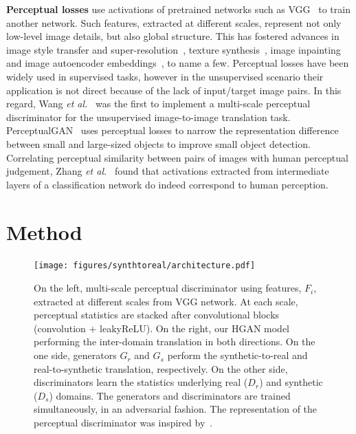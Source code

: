 \vspace*{0.1cm}\noindent\textbf{Perceptual losses} use activations of pretrained networks such as VGG~\cite{Simonyan2015} to train another network. Such features, extracted at different scales, represent not only low-level image details, but also global structure. This has fostered advances in image style transfer and super-resolution~\cite{Johnson2016,Wang2020}, texture synthesis~\cite{Ulyanov2016}, image inpainting~\cite{Su2019} and image autoencoder embeddings~\cite{Pihlgren2020}, to name a few. Perceptual losses have been widely used in supervised tasks, however in the unsupervised scenario their application is not direct because of the lack of input/target image pairs. In this regard, Wang \textit{et al.}~\cite{Wang2018} was the first to implement a multi-scale perceptual discriminator for the unsupervised image-to-image translation task. PerceptualGAN~\cite{Li2017} uses perceptual losses to narrow the representation difference between small and large-sized objects to improve small object detection. Correlating perceptual similarity between pairs of images with human perceptual judgement, Zhang \textit{et al.}~\cite{Zhang2018} found that activations extracted from intermediate layers of a classification network do indeed correspond to human perception.

\section{Method}
\label{cha:synthtoreal:cha:method}

\begin{figure}[!htb]
	\centering
	\texttt{[image: figures/synthtoreal/architecture.pdf]}
	\caption{On the left, multi-scale perceptual discriminator using features, $F_i$, extracted at different scales from VGG network. At each scale, perceptual statistics are stacked after convolutional blocks (convolution + leakyReLU). On the right, our \ac{HGAN} model performing the inter-domain translation in both directions. On the one side, generators $G_r$ and $G_s$ perform the synthetic-to-real and real-to-synthetic translation, respectively. On the other side, discriminators learn the statistics underlying real ($D_r$) and synthetic ($D_s$) domains. The generators and discriminators are trained simultaneously, in an adversarial fashion. The representation of the perceptual discriminator was inspired by~\cite{Sungatullina2018}.}
	\label{fig:architecture}
\end{figure}

